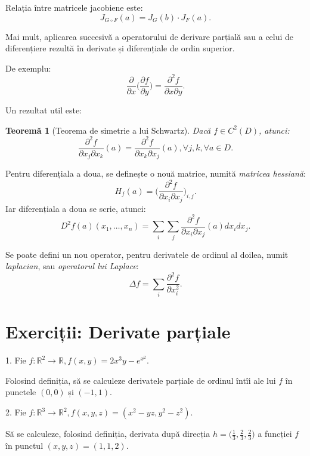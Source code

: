 \documentclass[11pt,a4paper]{article}
\newcommand\RR{\mathbb{R}}
\theoremstyle{dotless}
\newtheorem{theorem}{Teorem\u{a}}[section]
\theoremstyle{dotlessdr}
\begin{document}
Relația între matricele jacobiene este:
\[
  J_{G \circ F}(a) = J_G(b) \cdot J_F(a).
\]

Mai mult, aplicarea succesivă a operatorului de derivare parțială sau a celui de
diferențiere rezultă în derivate și diferențiale de ordin superior.

De exemplu:
\[
  \frac{\partial}{\partial x} \Big( \frac{\partial f}{\partial y} \Big) = %
  \frac{\partial^2 f}{\partial x \partial y}.
\]

Un rezultat util este:

\begin{theorem}[Teorema de simetrie a lui Schwartz]\label{thm:schwartz}
  Dacă $f \in C^2(D)$, atunci:
  \[
    \frac{\partial^2 f}{\partial x_j \partial x_k} (a) = %
    \frac{\partial^2 f}{\partial x_k \partial x_j} (a), \forall j, k, \forall a \in D.
  \]
\end{theorem}

Pentru diferențiala a doua, se definește o nouă matrice, numită \emph{matricea hessiană}:
\[
  H_f(a) = \Big( \frac{\partial^2 f}{\partial x_i \partial x_j} \Big)_{i, j}.
\]
Iar diferențiala a doua se scrie, atunci:
\[
  D^2f(a)(x_1, \dots, x_n) = \sum_i \sum_j \frac{\partial^2 f}{\partial x_i \partial x_j} (a) dx_i dx_j.
\]

Se poate defini un nou operator, pentru derivatele de ordinul al doilea, numit \emph{laplacian},
sau \emph{operatorul lui Laplace}:
\[
  \Delta f = \sum_i \frac{\partial^2 f}{\partial x_i^2}.
\]


\section{Exerciții: Derivate parțiale}
\label{sec:ex-dp}

1. Fie $f : \RR^2 \to \RR, f(x, y) = 2x^3y - e^{x^2}$.

Folosind definiția, să se calculeze derivatele parțiale de ordinul întîi ale lui $f$
în punctele $(0, 0)$ și $(-1, 1)$.

\vspace{1cm}

2. Fie $f : \RR^3 \to \RR^2, f(x, y, z) = (x^2 - yz, y^2 - z^2)$.

Să se calculeze, folosind definiția, derivata după direcția
$h = \big( \frac{1}{3}, \frac{2}{3}, \frac{2}{3} \big)$ a funcției $f$ în punctul
$(x, y, z) = (1, 1, 2)$.

\vspace{1cm}
\end{document}
